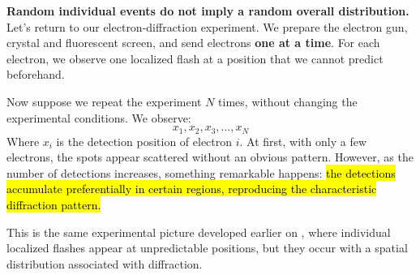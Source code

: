 \highspace
\textcolor{Green3}{ \textbf{Random individual events do not imply a random overall distribution.}} Let's return to our electron-diffraction experiment. We prepare the electron gun, crystal and fluorescent screen, and send electrons \textbf{one at a time}. For each electron, we observe one localized flash at a position that we cannot predict beforehand.

\highspace
Now suppose we repeat the experiment $N$ times, without changing the experimental conditions. We observe:
\begin{equation*}
    x_1, x_2, x_3, \ldots, x_N
\end{equation*}
Where $x_i$ is the detection position of electron $i$. At first, with only a few electrons, the spots appear scattered without an obvious pattern. However, as the number of detections increases, something remarkable happens: \hl{the detections accumulate preferentially in certain regions, reproducing the characteristic diffraction pattern.}

\highspace
This is the same experimental picture developed earlier on , where individual localized flashes appear at unpredictable positions, but they occur with a spatial distribution associated with diffraction.

